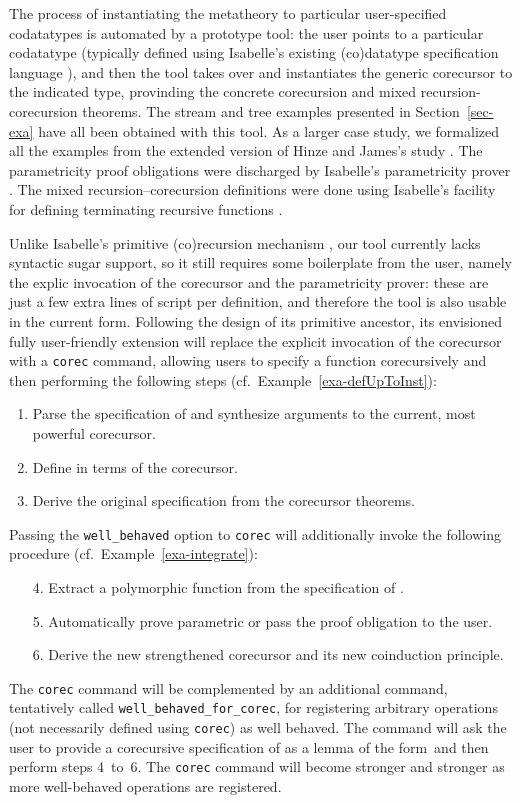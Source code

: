 \documentclass[preprint,draft]
{sigplanconf}
\newcommand\keyw[1]{\texttt{#1}}
\newcommand{\<}{\langle}
\renewcommand{\>}{\rangle}
\begin{document}
The process of instantiating the metatheory to particular user-specified codatatypes
is automated by a prototype tool: the user points to a particular codatatype (typically defined using
Isabelle's existing (co)datatype specification language \cite{blanchette-et-al-2014-impl}), and then the tool
takes over and instantiates the generic corecursor to the indicated type, provinding the concrete corecursion
and mixed recursion-corecursion theorems.
The stream and
tree examples presented in Section~\ref{sec-exa} have all been obtained with this tool.
As a larger case study, we formalized all the examples
from the extended version of Hinze and James's study \cite{hinze-adventure}. The parametricity proof obligations were discharged by Isabelle's
parametricity prover \cite{huffman-lifting}.
The mixed recursion--corecursion definitions were done using Isabelle's
facility for defining terminating recursive functions \cite{krauss-fun}.




Unlike Isabelle's {\relax primitive} (co)recursion mechanism \cite{blanchette-et-al-2014-impl},
our tool currently lacks syntactic sugar support,
so it still requires some boilerplate from the user, namely the explic invocation of the corecursor
and the parametricity prover: these are just a few extra lines of script per definition, and therefore the tool is
also usable in the current form.
Following the design of its primitive ancestor, its envisioned fully user-friendly extension will replace the explicit invocation of the
corecursor with a \keyw{corec} command,
allowing users to specify a function  corecursively and
then performing the following steps (cf.\ Example~\ref{exa-defUpToInst}):
\begin{enumerate}
\item Parse the specification of  and synthesize arguments to the
current, most powerful corecursor.
\item Define  in terms of the corecursor.
\item Derive the original specification from the corecursor theorems.
\end{enumerate}
Passing the \keyw{well\_behaved} option to \keyw{corec}
will additionally invoke the following procedure (cf.\ Example~\ref{exa-integrate}):
\begin{enumerate}
\item[4.] Extract a polymorphic function  from the specification of .
\item[5.] Automatically prove  parametric or pass the proof obligation to the user.
\item[6.] Derive the new strengthened corecursor and its new coinduction principle.
\end{enumerate}
The \keyw{corec} command will be complemented by an additional command,
tentatively called \keyw{well\_behaved\_for\_corec}, for registering arbitrary operations
 (not necessarily defined using
\keyw{corec}) as well behaved. The command will ask the user to provide a
corecursive specification of  as a lemma of the form
 \,and then perform steps 4~to~6.
The \keyw{corec} command will become
stronger and stronger as more well-behaved operations are registered.
\end{document}
